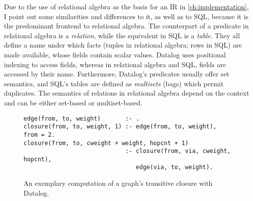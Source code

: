 Due to the use of relational algebra as the basis for an \ac{IR}
in \ref{ch:implementation}, I point out some similarities and differences to it,
as well as to SQL, because it is the predominant frontend to relational algebra.
The counterpart of a predicate in relational algebra is a \emph{relation}, while
the equivalent in SQL is a \emph{table}.
They all define a name under which facts (tuples in relational algebra;
rows in SQL) are made available, whose fields contain scalar values.
Datalog uses positional indexing to access fields, whereas in
relational algebra and SQL, fields are accessed by their name.
Furthermore, Datalog's predicates usually offer set semantics,
and SQL's tables are defined as \emph{multisets} (bags) which permit duplicates.
The semantics of relations in relational algebra depend on the context and
can be either set-based or multiset-based.

\begin{figure}[htpb]
	\centering
	\begin{lstlisting}[keepspaces]
edge(from, to, weight)       :- .
closure(from, to, weight, 1) :- edge(from, to, weight), from = 2.
closure(from, to, cweight + weight, hopcnt + 1)
                             :- closure(from, via, cweight, hopcnt),
                                edge(via, to, weight).\end{lstlisting}
	\caption{An exemplary computation of a graph's transitive closure with Datalog.}\label{code:trans-closure-datalog}
\end{figure}

